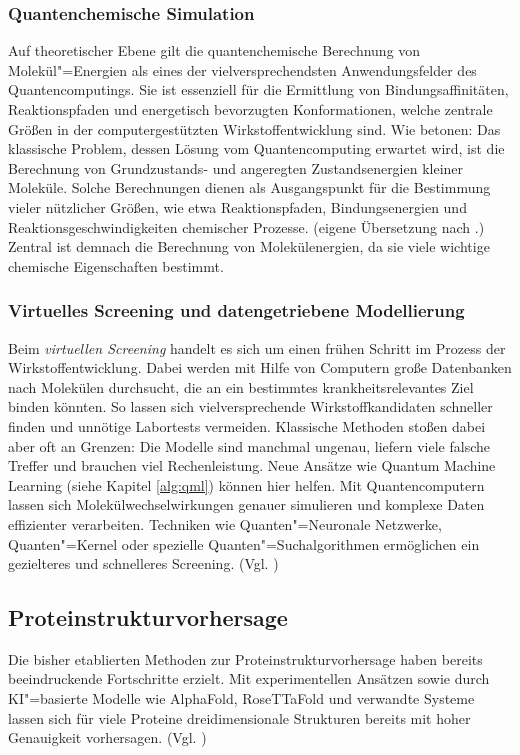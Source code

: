 \subsubsection*{Quantenchemische Simulation}
Auf theoretischer Ebene gilt die quantenchemische Berechnung von Molekül"=Energien als eines der vielversprechendsten Anwendungsfelder des Quantencomputings. Sie ist essenziell für die Ermittlung von Bindungsaffinitäten, Reaktionspfaden und energetisch bevorzugten Konformationen, welche zentrale Größen in der computergestützten Wirkstoffentwicklung sind. Wie \cite{cao_quantum_2019} betonen: Das klassische Problem, dessen Lösung vom Quantencomputing erwartet wird, ist die Berechnung von Grundzustands- und angeregten Zustandsenergien kleiner Moleküle. Solche Berechnungen dienen als Ausgangspunkt für die Bestimmung vieler nützlicher Größen, wie etwa Reaktionspfaden, Bindungsenergien und Reaktionsgeschwindigkeiten chemischer Prozesse. (eigene Übersetzung nach \cite{cao_quantum_2019}.) Zentral ist demnach die Berechnung von Molekülenergien, da sie viele wichtige chemische Eigenschaften bestimmt.\\

\subsubsection*{Virtuelles Screening und datengetriebene Modellierung}
Beim \textit{virtuellen Screening} handelt es sich um einen frühen Schritt im Prozess der Wirkstoffentwicklung. Dabei werden mit Hilfe von Computern große Datenbanken nach Molekülen durchsucht, die an ein bestimmtes krankheitsrelevantes Ziel binden könnten. So lassen sich vielversprechende Wirkstoffkandidaten schneller finden und unnötige Labortests vermeiden. Klassische Methoden stoßen dabei aber oft an Grenzen: Die Modelle sind manchmal ungenau, liefern viele falsche Treffer und brauchen viel Rechenleistung. Neue Ansätze wie Quantum Machine Learning (siehe Kapitel \ref{alg:qml}) können hier helfen. Mit Quantencomputern lassen sich Molekülwechselwirkungen genauer simulieren und komplexe Daten effizienter verarbeiten. Techniken wie Quanten"=Neuronale Netzwerke, Quanten"=Kernel oder spezielle Quanten"=Suchalgorithmen ermöglichen ein gezielteres und schnelleres Screening. (Vgl. \cite{kumar2024})


\subsection{Proteinstrukturvorhersage}
\label{med:protein}
Die bisher etablierten Methoden zur Proteinstrukturvorhersage haben bereits beeindruckende Fortschritte erzielt. Mit experimentellen Ansätzen sowie durch KI"=basierte Modelle wie AlphaFold, RoseTTaFold und verwandte Systeme lassen sich für viele Proteine dreidimensionale Strukturen bereits mit hoher Genauigkeit vorhersagen. (Vgl. \cite{jumper2021, baek2021})\\

